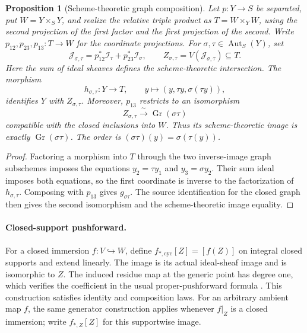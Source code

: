 \documentclass[11pt]{article}
\newtheorem{proposition}[theorem]{Proposition}
\theoremstyle{definition}
\theoremstyle{remark}
\begin{document}
\begin{proposition}[Scheme-theoretic graph composition]
\label{prop:graph-composition}
Let \(p:Y\to S\) be separated, put \(W=Y\times_S Y\), and realize the
relative triple product as \(T=W\times_Y W\), using the second projection
of the first factor and the first projection of the second. Write
\(p_{12},p_{23},p_{13}:T\to W\) for the coordinate projections. For
\(\sigma,\tau\in\operatorname{Aut}_S(Y)\), set
\[
  \mathcal J_{\sigma,\tau}
    =p_{12}^*\mathcal I_\tau+p_{23}^*\mathcal I_\sigma,
  \qquad Z_{\sigma,\tau}=V(\mathcal J_{\sigma,\tau})\subseteq T.
\]
Here the sum of ideal sheaves defines the scheme-theoretic intersection.
The morphism
\[
  h_{\sigma,\tau}:Y\longrightarrow T,
  \qquad y\longmapsto(y,\tau y,\sigma(\tau y)),
\]
identifies \(Y\) with \(Z_{\sigma,\tau}\). Moreover, \(p_{13}\) restricts
to an isomorphism
\[
  Z_{\sigma,\tau}\xrightarrow{\ \sim\ }
    \operatorname{Gr}(\sigma\tau)
\]
compatible with the closed inclusions into \(W\). Thus its
scheme-theoretic image is exactly \(\operatorname{Gr}(\sigma\tau)\).
The order is \((\sigma\tau)(y)=\sigma(\tau(y))\).
\end{proposition}

\begin{proof}
Factoring a morphism into \(T\) through the two inverse-image graph
subschemes imposes the equations \(y_2=\tau y_1\) and
\(y_3=\sigma y_2\). Their sum ideal imposes both equations, so the first
coordinate is inverse to the factorization of \(h_{\sigma,\tau}\).
Composing with \(p_{13}\) gives \(g_{\sigma\tau}\). The source
identification for the closed graph then gives the second isomorphism
and the scheme-theoretic image equality.
\end{proof}

\paragraph{Closed-support pushforward.}
For a closed immersion \(f:V\hookrightarrow W\), define
\(f_{*,\mathrm{cyc}}[Z]=[f(Z)]\) on integral closed supports and extend
linearly. The image is its actual ideal-sheaf image and is isomorphic to
\(Z\). The induced residue map at the generic point has degree one,
which verifies the coefficient in the usual proper-pushforward formula
\cite{StacksProperCyclePushforward}. This construction satisfies identity
and composition laws. For an arbitrary ambient map \(f\), the same
generator construction applies whenever \(f|_Z\) is a closed immersion;
write \(f_{*,Z}[Z]\) for this supportwise image.
\end{document}
